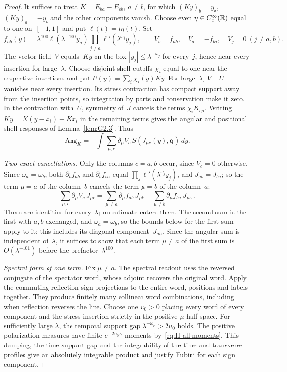 \begin{proof}
It suffices to treat $K=E_{ba}-E_{ab}$, $a\ne b$, for which $(Ky)_b=y_a$, $(Ky)_a=-y_b$ and the other components vanish. Choose even $\eta\in C_c^\infty(\mathbb{R})$ equal to one on~$[-1,1]$ and put $\ell(t)=t\eta(t)$. Set
\begin{equation*}
f_{ab}(y)=\lambda^{100}\ell(\lambda^{-100}y_a)
 \prod_{j\ne a}\ell'(\lambda^{\omega_j}y_j),\qquad
V_b=f_{ab},\quad V_a=-f_{ba},\quad V_j=0\ (j\ne a,b).
\end{equation*}
The vector field~$V$ equals~$Ky$ on the box $|y_j|\le\lambda^{-\omega_j}$ for every~$j$, hence near every insertion for large~$\lambda$. Choose disjoint shell cutoffs $\chi_i$ equal to one near the respective insertions and put $U(y)=\sum_i\chi_i(y)Ky$. For large~$\lambda$, $V-U$ vanishes near every insertion. Its stress contraction has compact support away from the insertion points, so integration by parts and conservation make it zero. In the contraction with~$U$, symmetry of~$J$ cancels the terms $\chi_i K_{c\mu}$. Writing $Ky=K(y-x_i)+Kx_i$ in the remaining terms gives the angular and positional shell responses of Lemma~\ref{lem:G2.3}. Thus
\[
 \mathrm{Ang}_K=-\int\sum_{\mu,c}\partial_\mu V_c\,S(J_{\mu c}(y),\boldsymbol q)\,dy.
\]

\emph{Two exact cancellations.} Only the columns $c=a,b$ occur, since $V_c=0$ otherwise. Since $\omega_a=\omega_b$, both $\partial_af_{ab}$ and $\partial_bf_{ba}$ equal $\prod_j\ell'(\lambda^{\omega_j}y_j)$, and $J_{ab}=J_{ba}$; so the term $\mu=a$ of the column~$b$ cancels the term $\mu=b$ of the column~$a$:
\begin{equation}\label{eq:G-cancellations}
\sum_{\mu,c}\partial_\mu V_c\,J_{\mu c}
=\sum_{\mu\ne a}\partial_\mu f_{ab}\,J_{\mu b}-\sum_{\mu\ne b}\partial_\mu f_{ba}\,J_{\mu a}\,.
\end{equation}
These are identities for every~$\lambda$; no estimate enters them. The second sum is the first with $a,b$ exchanged, and $\omega_a=\omega_b$, so the bounds below for the first sum apply to it; this includes its diagonal component~$J_{aa}$. Since the angular sum is independent of~$\lambda$, it suffices to show that each term $\mu\ne a$ of the first sum is $O(\lambda^{-101})$ before the prefactor~$\lambda^{100}$.

\emph{Spectral form of one term.} Fix $\mu\ne a$. The spectral readout uses the reversed conjugate of the spectator word, whose adjoint recovers the original word. Apply the commuting reflection-sign projections to the entire word, positions and labels together. They produce finitely many collinear word combinations, including when reflection reverses the line. Choose one $u_0>0$ placing every word of every component and the stress insertion strictly in the positive $\mu$-half-space. For sufficiently large $\lambda$, the temporal support gap $\lambda^{-\omega_\mu}>2u_0$ holds. The positive polarization measures have finite $e^{-2u_0E}$ moments by~\eqref{eq:H-all-moments}. This damping, the time support gap and the integrability of the time and transverse profiles give an absolutely integrable product and justify Fubini for each sign component.


\end{proof}
